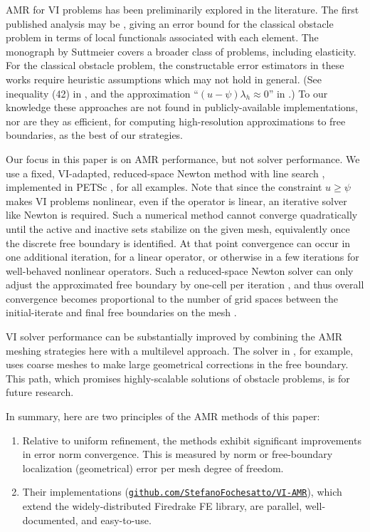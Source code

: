 \documentclass[]{interact}
\theoremstyle{plain}%
\theoremstyle{definition}
\theoremstyle{remark}
\begin{document}
AMR for VI problems has been preliminarily explored in the literature.  The first published analysis may be \cite{AinsworthOdenLee1993}, giving an error bound for the classical obstacle problem in terms of local functionals associated with each element.  The monograph by Suttmeier \cite{Suttmeier2008} covers a broader class of problems, including elasticity.  For the classical obstacle problem, the constructable error estimators in these works require heuristic assumptions which may not hold in general.  (See inequality (42) in \cite{AinsworthOdenLee1993}, and the approximation ``$(u-\psi)\lambda_h\approx 0$'' in \cite{Suttmeier2008}.)  To our knowledge these approaches are not found in publicly-available implementations, nor are they as efficient, for computing high-resolution approximations to free boundaries, as the best of our strategies.

Our focus in this paper is on AMR performance, but not solver performance.  We use a fixed, VI-adapted, reduced-space Newton method with line search \cite{BensonMunson2006}, implemented in PETSc \cite{petsc-user-ref}, for all examples.  Note that since the constraint $u \geq \psi$ makes VI problems nonlinear, even if the operator is linear, an iterative solver like Newton is required.  Such a numerical method cannot converge quadratically until the active and inactive sets stabilize on the given mesh, equivalently once the discrete free boundary is identified.  At that point convergence can occur in one additional iteration, for a linear operator, or otherwise in a few iterations for well-behaved nonlinear operators.  Such a reduced-space Newton solver can only adjust the approximated free boundary by one-cell per iteration \citep{GraeserKornhuber2009}, and thus overall convergence becomes proportional to the number of grid spaces between the initial-iterate and final free boundaries on the mesh \citep{Bueler2021}.

VI solver performance can be substantially improved by combining the AMR meshing strategies here with a multilevel approach.  The solver in \cite{BuelerFarrell2024}, for example, uses coarse meshes to make large geometrical corrections in the free boundary.  This path, which promises highly-scalable solutions of obstacle problems, is for future research.

In summary, here are two principles of the AMR methods of this paper:
\renewcommand{\labelenumi}{\arabic{enumi}.}
\begin{enumerate}
\item Relative to uniform refinement, the methods exhibit significant improvements in error norm convergence.  This is measured by norm or free-boundary localization (geometrical) error per mesh degree of freedom.
\item Their implementations (\href{https://github.com/StefanoFochesatto/VI-AMR}{{\small \texttt{github.com/StefanoFochesatto/VI-AMR}}}), which extend the widely-distributed Firedrake \cite{Langeetal2016} FE library, are parallel, well-documented, and easy-to-use.
\end{enumerate}
\end{document}
